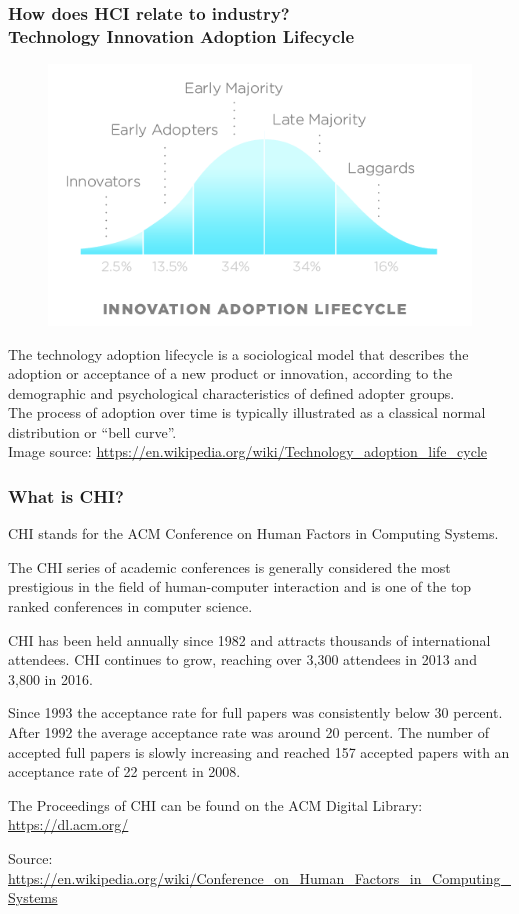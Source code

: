 \documentclass[screen, aspectratio=169]{beamer}
\begin{document}
%
\begin{frame}[shrink=20]
\frametitle{How does HCI relate to industry?\\ Technology Innovation Adoption Lifecycle}
\begin{figure}
\includegraphics[scale=0.45]{img/DiffusionOfInnovation.png}
\end{figure}
The technology adoption lifecycle is a sociological model that describes the adoption or acceptance of a new product or innovation, according to the demographic and psychological characteristics of defined adopter groups. \\
The process of adoption over time is typically illustrated as a classical normal distribution or ``bell curve''.  \cite{Rogers.1983.diffusion}\\
{\scriptsize Image source: \url{https://en.wikipedia.org/wiki/Technology_adoption_life_cycle}}
\end{frame}
%
\begin{frame}
\frametitle{What is CHI?}
\begin{itemize}
{\small
\item CHI stands for the ACM Conference on Human Factors in Computing Systems.
\item The CHI series of academic conferences is generally considered the most prestigious in the field of human-computer interaction and is one of the top ranked conferences in computer science.
\item CHI has been held annually since 1982 and attracts thousands of international attendees. CHI continues to grow, reaching over 3,300 attendees in 2013 and 3,800 in 2016.
\item Since 1993 the acceptance rate for full papers was consistently below 30 percent. After 1992 the average acceptance rate was around 20 percent. The number of accepted full papers is slowly increasing and reached 157 accepted papers with an acceptance rate of 22 percent in 2008.
\item The Proceedings of CHI can be found on the ACM Digital Library: \url{https://dl.acm.org/}
}
\end{itemize}
{\scriptsize Source: \url{https://en.wikipedia.org/wiki/Conference_on_Human_Factors_in_Computing_Systems}}
\end{frame}
\end{document}
